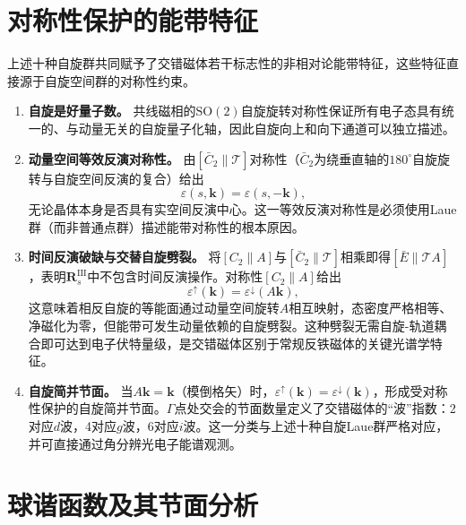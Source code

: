 \section{对称性保护的能带特征}\label{sec:band-features}

上述十种自旋群共同赋予了交错磁体若干标志性的非相对论能带特征，这些特征直接源于自旋空间群的对称性约束。

\begin{enumerate}
\item \textbf{自旋是好量子数。} 共线磁相的$\mathrm{SO}(2)$自旋旋转对称性保证所有电子态具有统一的、与动量无关的自旋量子化轴，因此自旋向上和向下通道可以独立描述\cite{Smejkal2022PRX}。

\item \label{item:P_sym} \textbf{动量空间等效反演对称性。} 由$[\bar{C}_2\|\mathcal{T}]$对称性（$\bar{C}_2$为绕垂直轴的$180^\circ$自旋旋转与自旋空间反演的复合）给出
\begin{equation}
\varepsilon(s,\mathbf{k}) = \varepsilon(s,-\mathbf{k}),
\end{equation}
无论晶体本身是否具有实空间反演中心。这一等效反演对称性是必须使用Laue群（而非普通点群）描述能带对称性的根本原因\cite{Smejkal2022PRX}。

\item \textbf{时间反演破缺与交替自旋劈裂。} 将$[C_2\|A]$与$[\bar{C}_2\|\mathcal{T}]$相乘即得$[\bar{E}\|\mathcal{T}A]$，表明$\mathbf{R}_s^{\mathrm{III}}$中不包含时间反演操作。对称性$[C_2\|A]$给出
\begin{equation}
\varepsilon^{\uparrow}(\mathbf{k}) = \varepsilon^{\downarrow}(A\mathbf{k}),
\end{equation}
这意味着相反自旋的等能面通过动量空间旋转$A$相互映射，态密度严格相等、净磁化为零，但能带可发生动量依赖的自旋劈裂。这种劈裂无需自旋-轨道耦合即可达到电子伏特量级，是交错磁体区别于常规反铁磁体的关键光谱学特征\cite{Smejkal2022PRX,jungwirth_symmetry_2026}。

\item \textbf{自旋简并节面。} 当$A\mathbf{k}=\mathbf{k}$（模倒格矢）时，$\varepsilon^{\uparrow}(\mathbf{k})=\varepsilon^{\downarrow}(\mathbf{k})$，形成受对称性保护的自旋简并节面。$\Gamma$点处交会的节面数量定义了交错磁体的“波”指数：2对应$d$波，4对应$g$波，6对应$i$波。这一分类与上述十种自旋Laue群严格对应，并可直接通过角分辨光电子能谱观测\cite{jungwirth_symmetry_2026}。
\end{enumerate}

\section{球谐函数及其节面分析}\label{sec:spherical-harmonics}

